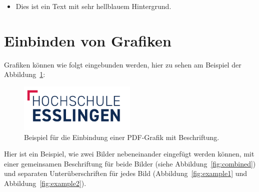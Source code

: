 \begin{itemize}
  \item \colorbox{hse-blau15}{Dies ist ein Text mit sehr hellblauem Hintergrund.}
\end{itemize}



\section{Einbinden von Grafiken}

Grafiken können wie folgt eingebunden werden, hier zu sehen am Beispiel der
Abbildung~\ref{fig:example}:

\begin{figure}[htb!]
  \centering
  \includegraphics[width=0.5\textwidth]{figures/hs-esslingen-logo}
  \caption{Beispiel für die Einbindung einer PDF-Grafik mit Beschriftung.}
  \label{fig:example}
\end{figure}

Hier ist ein Beispiel, wie zwei Bilder nebeneinander eingefügt werden können,
mit einer gemeinsamen Beschriftung für beide Bilder (siehe
Abbildung~\ref{fig:combined}) und separaten Unterüberschriften für jedes Bild
(Abbildung~\ref{fig:example1} und Abbildung~\ref{fig:example2}).

